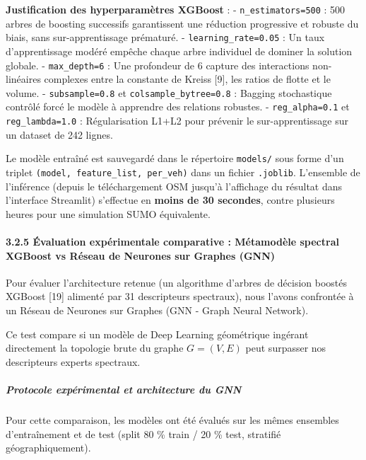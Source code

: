 \documentclass[10pt, a4paper]{article}
\begin{document}
\textbf{Justification des hyperparamètres XGBoost} : -
\texttt{n\_estimators=500} : 500 arbres de boosting successifs
garantissent une réduction progressive et robuste du biais, sans
sur-apprentissage prématuré. - \texttt{learning\_rate=0.05} : Un taux
d'apprentissage modéré empêche chaque arbre individuel de dominer la
solution globale. - \texttt{max\_depth=6} : Une profondeur de 6 capture
des interactions non-linéaires complexes entre la constante de Kreiss
{[}9{]}, les ratios de flotte et le volume. - \texttt{subsample=0.8} et
\texttt{colsample\_bytree=0.8} : Bagging stochastique contrôlé forcé le
modèle à apprendre des relations robustes. - \texttt{reg\_alpha=0.1} et
\texttt{reg\_lambda=1.0} : Régularisation L1+L2 pour prévenir le
sur-apprentissage sur un dataset de 242 lignes.

Le modèle entraîné est sauvegardé dans le répertoire \texttt{models/}
sous forme d'un triplet
\texttt{(model,\ feature\_list,\ \textquotesingle{}per\_veh\textquotesingle{})}
dans un fichier \texttt{.joblib}. L'ensemble de l'inférence (depuis le
téléchargement OSM jusqu'à l'affichage du résultat dans l'interface
Streamlit) s'effectue en \textbf{moins de 30 secondes}, contre plusieurs
heures pour une simulation SUMO équivalente.

\paragraph{3.2.5 Évaluation expérimentale comparative : Métamodèle
spectral XGBoost vs Réseau de Neurones sur Graphes
(GNN)}\label{uxe9valuation-expuxe9rimentale-comparative-muxe9tamoduxe8le-spectral-xgboost-vs-ruxe9seau-de-neurones-sur-graphes-gnn}

Pour évaluer l'architecture retenue (un algorithme d'arbres de décision
boostés XGBoost {[}19{]} alimenté par 31 descripteurs spectraux), nous
l'avons confrontée à un Réseau de Neurones sur Graphes (GNN - Graph
Neural Network).

Ce test compare si un modèle de Deep Learning géométrique ingérant
directement la topologie brute du graphe \(G=(V, E)\) peut surpasser nos
descripteurs experts spectraux.

\subparagraph{Protocole expérimental et architecture du
GNN}\label{protocole-expuxe9rimental-et-architecture-du-gnn}

Pour cette comparaison, les modèles ont été évalués sur les mêmes
ensembles d'entraînement et de test (split 80 \% train / 20 \% test,
stratifié géographiquement).
\end{document}
